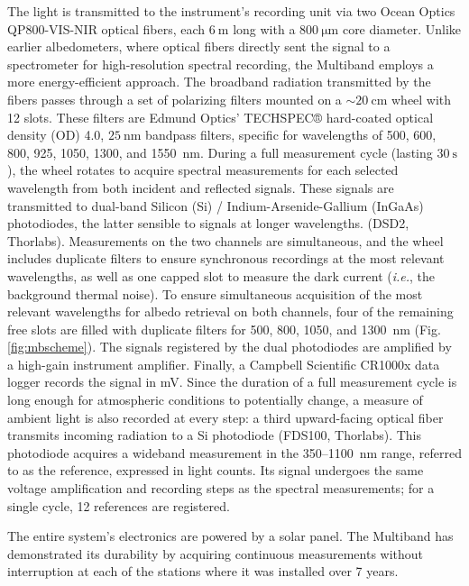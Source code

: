 \documentclass[11pt,a4paper]{article}
\newcommand{\ie}{\emph{i.e.}, }
\begin{document}
	The light is transmitted to the instrument’s recording unit via two Ocean Optics QP800-VIS-NIR optical fibers, each $\qty{6}{\meter}$ long with a $\qty{800}{\micro\meter}$ core diameter. Unlike earlier albedometers, where optical fibers directly sent the signal to a spectrometer for high-resolution spectral recording, the Multiband employs a more energy-efficient approach. The broadband radiation transmitted by the fibers passes through a set of polarizing filters mounted on a $\sim\qty{20}{\centi\meter}$ wheel with 12 slots. These filters are Edmund Optics’ TECHSPEC® hard-coated optical density (OD) 4.0, $\qty{25}{\nano\meter}$ bandpass filters, specific for wavelengths of 500, 600, 800, 925, 1050, 1300, and \qty{1550}{\nano\meter}. During a full measurement cycle (lasting $\qty{30}{\second}$), the wheel rotates to acquire spectral measurements for each selected wavelength from both incident and reflected signals. These signals are transmitted to dual-band Silicon (Si) / Indium-Arsenide-Gallium (InGaAs) photodiodes, the latter sensible to signals at longer wavelengths. (DSD2, Thorlabs). Measurements on the two channels are simultaneous, and the wheel includes duplicate filters to ensure synchronous recordings at the most relevant wavelengths, as well as one capped slot to measure the dark current (\ie the background thermal noise). To ensure simultaneous acquisition of the most relevant wavelengths for albedo retrieval on both channels, four of the remaining free slots are filled with duplicate filters for 500, 800, 1050, and \qty{1300}{\nano\meter} (Fig. \ref{fig:mbscheme}).
	The signals registered by the dual photodiodes are amplified by a high-gain instrument amplifier. Finally, a Campbell Scientific CR1000x data logger records the signal in \unit{\milli\volt}. Since the duration of a full measurement cycle is long enough for atmospheric conditions to potentially change, a measure of ambient light is also recorded at every step: a third upward-facing optical fiber transmits incoming radiation to a Si photodiode (FDS100, Thorlabs). This photodiode acquires a wideband measurement in the 350--\qty{1100}{\nano\meter} range, referred to as the reference, expressed in light counts. Its signal undergoes the same voltage amplification and recording steps as the spectral measurements; for a single cycle, 12 references are registered.
	
	The entire system’s electronics are powered by a solar panel. The Multiband has demonstrated its durability by acquiring continuous measurements without interruption at each of the stations where it was installed over 7 years.
	
\end{document}

